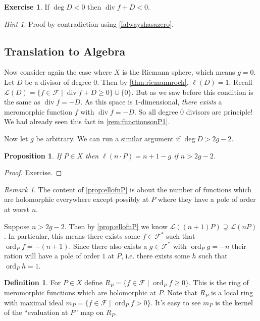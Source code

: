 \documentclass[11pt]{article}
\newcommand{\script}[1]{\mathcal{#1}} %
\newcommand{\sF}{\script{F}}
\newcommand{\sL}{\script{L}}
\newcommand{\st}{\mid}
\renewcommand{\div}{\operatorname{div}} %
\newcommand{\ord}{\operatorname{ord}}
\theoremstyle{plain}
\newtheorem{prop}[propositionCounter]{Proposition}
\theoremstyle{definition}
\newtheorem{defn}[definitionCounter]{Definition}
\newtheorem{excer}[exerciseCounter]{Exercise}
\theoremstyle{remark}
\newtheorem{rem}[remarkCounter]{Remark}
\newtheorem*{hint}{Hint}
\begin{document}
\begin{excer}
	If $\deg D < 0$ then $\div f + D < 0$.
	\begin{hint}
		Proof by contradiction using \autoref{falwayshasazero}.
	\end{hint}
\end{excer}

\subsection{Translation to Algebra}

Now consider again the case where $X$ is the Riemann sphere, which means $g=0$. Let $D$ be a divisor of degree $0$. Then by \autoref{thm:riemannroch}, $\ell(D) = 1$. Recall $\sL(D) = \{f\in\sF\st\div f + D \geq 0\}\cup\{0\}$. But as we saw before this condition is the same as $\div f = -D$. As this space is $1$-dimensional, \emph{there exists} a meromorphic function $f$ with $\div f = -D$. So all degree $0$ divisors are principle! We had already seen this fact in \autoref{rem:functionsonP1}.

Now let $g$ be arbitrary. We can run a similar argument if $\deg D > 2g-2$.

\begin{prop}\label{prop:ellofnP}
	If $P\in X$ then $\ell(n\cdot P) = n + 1 - g$ if $n > 2g-2$.
\end{prop}
\begin{proof}
	Exercise.
\end{proof}

\begin{rem}
	The content of \autoref{prop:ellofnP} is about the number of functions which are holomorphic everywhere except possibly at $P$ where they have a pole of order at worst $n$.
\end{rem}

Suppose $n > 2g-2$. Then by \autoref{prop:ellofnP} we know $\sL((n+1)P) \supsetneq\sL(nP)$. In particular, this means there exists some $f\in\sF^*$ such that $\ord_Pf = -(n+1)$. Since there also exists a $g\in\sF^*$ with $\ord_Pg = -n$ their ration will have a pole of order $1$ at $P$, i.e. there exists some $h$ such that $\ord_P h = 1$.

\begin{defn}
	For $P\in X$ define $R_P = \{f\in\sF\st \ord_Pf\geq 0\}$. This is the ring of meromorphic functions which are holomorphic at $P$. Note that $R_P$ is a local ring with maximal ideal $m_P = \{f\in\sF \st \ord_Pf > 0\}$. It's easy to see $m_P$ is the kernel of the ``evaluation at $P$'' map on $R_P$.
\end{defn}
\end{document}
